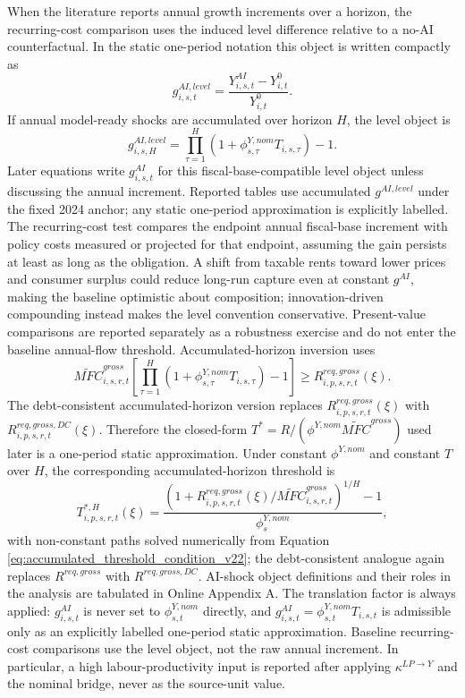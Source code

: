 \documentclass[11pt,a4paper]{article}
\begin{document}
When the literature reports annual growth increments over a horizon, the recurring-cost comparison uses the induced level difference relative to a no-AI counterfactual. In the static one-period notation this object is written compactly as
\begin{equation}
    g^{AI,level}_{i,s,t}=\frac{Y^{AI}_{i,s,t}-Y^{0}_{i,t}}{Y^{0}_{i,t}}.
\end{equation}
If annual model-ready shocks are accumulated over horizon $H$, the level object is
\begin{equation}
    g^{AI,level}_{i,s,H}=\prod_{\tau=1}^{H}\left(1+\phi^{Y,nom}_{s,\tau}T_{i,s,\tau}\right)-1.
\end{equation}
Later equations write $g^{AI}_{i,s,t}$ for this fiscal-base-compatible level object unless discussing the annual increment. Reported tables use accumulated $g^{AI,level}$ under the fixed 2024 anchor; any static one-period approximation is explicitly labelled. The recurring-cost test compares the endpoint annual fiscal-base increment with policy costs measured or projected for that endpoint, assuming the gain persists at least as long as the obligation. A shift from taxable rents toward lower prices and consumer surplus could reduce long-run capture even at constant $g^{AI}$, making the baseline optimistic about composition; innovation-driven compounding instead makes the level convention conservative. Present-value comparisons are reported separately as a robustness exercise and do not enter the baseline annual-flow threshold. Accumulated-horizon inversion uses
\begin{equation}\label{eq:accumulated_threshold_condition_v22}
    \widetilde{MFC}^{gross}_{i,s,r,t}\left[\prod_{\tau=1}^{H}\left(1+\phi^{Y,nom}_{s,\tau}T_{i,s,\tau}\right)-1\right]
    \geq R^{req,gross}_{i,p,s,r,t}(\xi).
\end{equation}
The debt-consistent accumulated-horizon version replaces $R^{req,gross}_{i,p,s,r,t}(\xi)$ with $R^{req,gross,DC}_{i,p,s,r,t}(\xi)$. Therefore the closed-form $T^*=R/(\phi^{Y,nom}\widetilde{MFC}^{gross})$ used later is a one-period static approximation. Under constant $\phi^{Y,nom}$ and constant $T$ over $H$, the corresponding accumulated-horizon threshold is
\begin{equation}\label{eq:Tstar_accumulated_constant_v22}
    T^{*,H}_{i,p,s,r,t}(\xi)=
    \frac{\left(1+R^{req,gross}_{i,p,s,r,t}(\xi)/\widetilde{MFC}^{gross}_{i,s,r,t}\right)^{1/H}-1}{\phi^{Y,nom}_{s}},
\end{equation}
with non-constant paths solved numerically from Equation \eqref{eq:accumulated_threshold_condition_v22}; the debt-consistent analogue again replaces $R^{req,gross}$ with $R^{req,gross,DC}$.
AI-shock object definitions and their roles in the analysis are tabulated in Online Appendix A. The translation factor is always applied: $g^{AI}_{i,s,t}$ is never set to $\phi^{Y,nom}_{s,t}$ directly, and $g^{AI}_{i,s,t}=\phi^{Y,nom}_{s,t}T_{i,s,t}$ is admissible only as an explicitly labelled one-period static approximation. Baseline recurring-cost comparisons use the level object, not the raw annual increment. In particular, a high labour-productivity input is reported after applying $\kappa^{LP\to Y}$ and the nominal bridge, never as the source-unit value.
\end{document}
